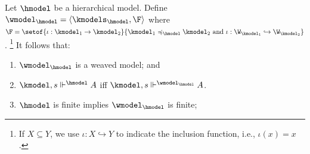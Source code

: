 \begin{proposition}\label{prop:hs2ws}
  Let $\hmodel$ be a hierarchical model.
  Define $\wmodel_{\hmodel} = \langle \kmodels_{\hmodel}, \F \rangle$ where $\F = \setof{\iota: \kmodel_1 \to \kmodel_2}{\kmodel_1 \preccurlyeq_{\hmodel} \kmodel_2 \text{ and } \iota: \W_{\kmodel_1} \hookrightarrow \W_{\kmodel_2}}$.%
    \footnote{If $X \subseteq Y$, we use $\iota: X \hookrightarrow Y$ to indicate the inclusion function, i.e., $\iota(x) = x$.}
  It follows that:
  \begin{enumerate}
    \setlength{\itemsep}{0pt}
    \item $\wmodel_{\hmodel}$ is a weaved model; and
    \item $\kmodel, s \Vdash^{\hmodel} A$ iff $\kmodel,s \Vdash^{\wmodel_{\hmodel}} A$.
    \item $\hmodel$ is finite implies $\wmodel_{\hmodel}$ is finite;
  \end{enumerate}
\end{proposition}

